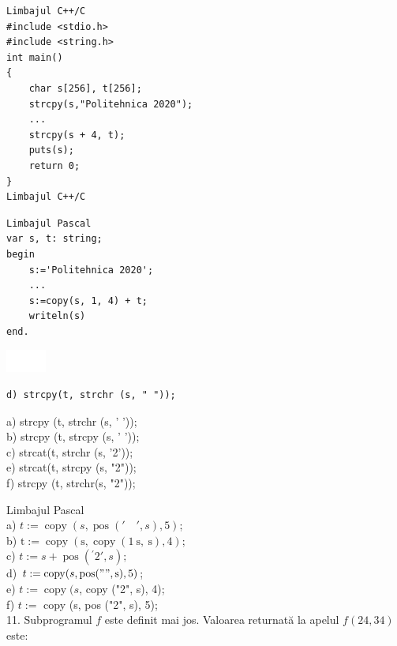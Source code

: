 \documentclass[10pt]{article}
\begin{document}
\begin{verbatim}
Limbajul C++/C
#include <stdio.h>
#include <string.h>
int main()
{
    char s[256], t[256];
    strcpy(s,"Politehnica 2020");
    ...
    strcpy(s + 4, t);
    puts(s);
    return 0;
}
Limbajul C++/C
\end{verbatim}

\begin{verbatim}
Limbajul Pascal
var s, t: string;
begin
    s:='Politehnica 2020';
    ...
    s:=copy(s, 1, 4) + t;
    writeln(s)
end.
\end{verbatim}

\begin{center}
\includegraphics[max width=\textwidth]{2025_04_17_46e04c6acd873ea9558dg-156}
\end{center}

\begin{verbatim}
d) strcpy(t, strchr (s, " "));
\end{verbatim}

a) strcpy (t, strchr (s, ' '));\\
b) strcpy (t, strcpy (s, ' '));\\
c) strcat(t, strchr (s, '2'));\\
e) strcat(t, strcpy (s, "2"));\\
f) strcpy (t, strchr(s, "2"));

Limbajul Pascal\\
a) $t:=\operatorname{copy}(s, \operatorname{pos}(' \quad ', s), 5)$;\\
b) $\mathrm{t}:=\operatorname{copy}(\mathrm{s}, \operatorname{copy}(1 \mathrm{~s}, \mathrm{~s}), 4)$;\\
c) $t:=s+\operatorname{pos}\left({ }^{\prime} 2 ', s\right) ;$\\
d) $t:=\operatorname{copy}(s, \operatorname{pos}(" \mathrm{"}, \mathrm{s}), 5)$;\\
e) $t:=\operatorname{copy}(s$, copy ("2", s), 4);\\
f) $t:=$ copy (s, pos ("2", s), 5);\\
11. Subprogramul $f$ este definit mai jos. Valoarea returnată la apelul $f(24,34)$ este:
\end{document}
